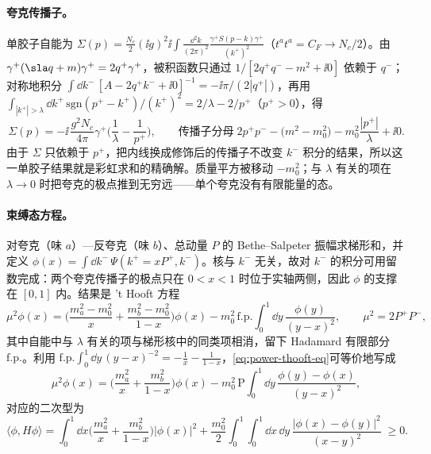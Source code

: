 \paragraph{夸克传播子。}
单胶子自能为 $\Sigma(p)=\frac{N_c}{2}(\ii g)^2\ii\int\frac{\dd^2k}{(2\pi)^2}\frac{\gamma^+S(p-k)\gamma^+}{(k^+)^2}$（$t^at^a=C_F\to N_c/2$）。由 $\gamma^+(\sla q+m)\gamma^+=2q^+\gamma^+$，被积函数只通过 $1/[2q^+q^--m^2+\ii0]$ 依赖于 $q^-$；对称地积分 $\int\dd k^-\,[A-2q^+k^-+\ii0]^{-1}=-\ii\pi/(2|q^+|)$，再用 $\int_{|k^+|>\lambda}\dd k^+\,\mathrm{sgn}(p^+-k^+)/(k^+)^2=2/\lambda-2/p^+$（$p^+>0$），得
\begin{equation}\label{eq:power-thooft-sigma}
\Sigma(p)=-\ii\,\frac{g^2N_c}{4\pi}\gamma^+\Big(\frac1\lambda-\frac{1}{p^+}\Big),\qquad
\text{传播子分母}\;2p^+p^--\big(m^2-m_0^2\big)-m_0^2\frac{|p^+|}{\lambda}+\ii0 .
\end{equation}
由于 $\Sigma$ 只依赖于 $p^+$，把内线换成修饰后的传播子不改变 $k^-$ 积分的结果，所以这一单胶子结果就是彩虹求和的精确解。质量平方被移动 $-m_0^2$；与 $\lambda$ 有关的项在 $\lambda\to0$ 时把夸克的极点推到无穷远——单个夸克没有有限能量的态。

\paragraph{束缚态方程。}
对夸克（味 $a$）—反夸克（味 $b$）、总动量 $P$ 的 Bethe--Salpeter 振幅求梯形和，并定义 $\phi(x)=\int\dd k^-\,\Psi(k^+=xP^+,k^-)$。核与 $k^-$ 无关，故对 $k^-$ 的积分可用留数完成：两个夸克传播子的极点只在 $0<x<1$ 时位于实轴两侧，因此 $\phi$ 的支撑在 $[0,1]$ 内。结果是 't Hooft 方程\cite{tHooft1974}
\begin{equation}\label{eq:power-thooft-eq}
\mu^2\phi(x)=\Big(\frac{m_a^2-m_0^2}{x}+\frac{m_b^2-m_0^2}{1-x}\Big)\phi(x)-m_0^2\,\mathrm{f.p.}\!\!\int_0^1\!\dd y\,\frac{\phi(y)}{(y-x)^2},\qquad\mu^2=2P^+P^-,
\end{equation}
其中自能中与 $\lambda$ 有关的项与梯形核中的同类项相消，留下 Hadamard 有限部分 $\mathrm{f.p.}$。利用 $\mathrm{f.p.}\int_0^1\dd y\,(y-x)^{-2}=-\frac1x-\frac1{1-x}$，\eqref{eq:power-thooft-eq}可等价地写成
\begin{equation}\label{eq:power-thooft-pv}
\mu^2\phi(x)=\Big(\frac{m_a^2}{x}+\frac{m_b^2}{1-x}\Big)\phi(x)-m_0^2\,\mathrm{P}\!\!\int_0^1\!\dd y\,\frac{\phi(y)-\phi(x)}{(y-x)^2},
\end{equation}
对应的二次型为
\begin{equation}\label{eq:power-thooft-form}
\langle\phi,H\phi\rangle=\int_0^1\!\dd x\Big(\frac{m_a^2}{x}+\frac{m_b^2}{1-x}\Big)|\phi(x)|^2+\frac{m_0^2}{2}\int_0^1\!\!\int_0^1\!\dd x\,\dd y\,\frac{|\phi(x)-\phi(y)|^2}{(x-y)^2}\;\ge0 .
\end{equation}

